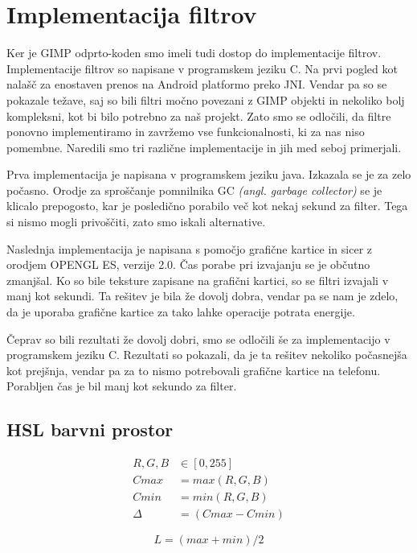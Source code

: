 \section{Implementacija filtrov}
Ker je GIMP odprto-koden smo imeli tudi dostop do implementacije filtrov.
Implementacije filtrov so napisane v programskem jeziku C. Na prvi pogled kot
nalašč za enostaven prenos na Android platformo preko JNI. Vendar pa so se
pokazale težave, saj so bili filtri močno povezani z GIMP objekti in nekoliko
bolj kompleksni, kot bi bilo potrebno za naš projekt. Zato smo se odločili, da
filtre ponovno implementiramo in zavržemo vse funkcionalnosti, ki za nas niso
pomembne. Naredili smo tri različne implementacije in jih med seboj primerjali.

Prva implementacija je napisana v programskem jeziku java. Izkazala se je za
zelo počasno. Orodje za sproščanje pomnilnika GC \textit{(angl. garbage
collector)} se je klicalo prepogosto, kar je posledično porabilo več kot nekaj
sekund za filter. Tega si nismo mogli privoščiti, zato smo iskali alternative.

Naslednja implementacija je napisana s pomočjo grafične kartice in sicer z
orodjem OPENGL ES, verzije 2.0. Čas porabe pri izvajanju se je občutno
zmanjšal. Ko so bile teksture zapisane na grafični kartici, so se filtri
izvajali v manj kot sekundi. Ta rešitev je bila že dovolj dobra, vendar pa se
nam je zdelo, da je uporaba grafične kartice za tako lahke operacije potrata
energije.

Čeprav so bili rezultati že dovolj dobri, smo se odločili še za implementacijo
v programskem jeziku C. Rezultati so pokazali, da je ta rešitev nekoliko
počasnejša kot prejšnja, vendar pa za to nismo potrebovali grafične kartice na
telefonu. Porabljen čas je bil manj kot sekundo za filter.


\subsection{HSL barvni prostor}
\label{sec:hsl}

\begin{align}
R, G, B &\in [0,255] \nonumber \\
Cmax &= max(R, G, B) \\
Cmin &= min(R, G, B) \\
\Delta &= (Cmax - Cmin)
\end{align}

\begin{equation}
L = (max + min) / 2 \label{eq:hsl_l}
\end{equation}

